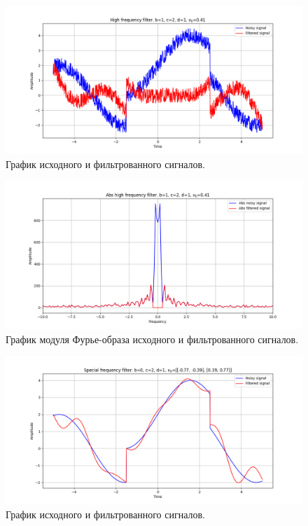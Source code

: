 \documentclass[a4paper, 12pt]{article}
\begin{document}
    \begin{figure}[!htb]
        \centering
        \includegraphics[scale=0.485]{1_2_u_flt_u_nospec.png}
        \captionsetup{skip=0pt}
        \caption{График исходного и фильтрованного сигналов.}
        \label{fig:fig75}
    \end{figure}
    \begin{figure}[!htb]
        \centering
        \includegraphics[scale=0.485]{1_2_abs_u_U_nospec.png}
        \captionsetup{skip=0pt}
        \caption{График модуля Фурье-образа исходного и фильтрованного сигналов.}
        \label{fig:fig76}
    \end{figure}
    \begin{figure}[!htb]
        \centering
        \includegraphics[scale=0.485]{2_u_flt_u_nospec.png}
        \captionsetup{skip=0pt}
        \caption{График исходного и фильтрованного сигналов.}
        \label{fig:fig77}
    \end{figure}
\end{document}
